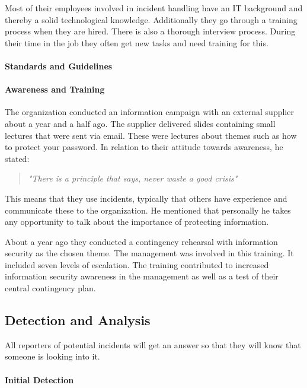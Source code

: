 Most of their employees involved in incident handling have an IT background and thereby a solid technological knowledge. Additionally they go through a training process when they are hired. There is also a thorough interview process. During their time in the job they often get new tasks and need training for this. 

\paragraph{Standards and Guidelines}

\paragraph{Awareness and Training}
The organization conducted an information campaign with an external supplier about a year and a half ago. The supplier delivered slides containing small lectures that were sent via email. These were lectures about themes such as how to protect your password. In relation to their attitude towards awareness, he stated: 

\begin{quote}
\textit{"There is a principle that says, never waste a good crisis"}
\end{quote}

This means that they use incidents, typically that others have experience and communicate these to the organization. He mentioned that personally he takes any opportunity to talk about the importance of protecting information.

About a year ago they conducted a contingency rehearsal with information security as the chosen theme. The management was involved in this training. It included seven levels of escalation. The training contributed to increased information security awareness in the management as well as a test of their central contingency plan.

\subsection{Detection and Analysis}
All reporters of potential incidents will get an answer so that they will know that someone is looking into it.

\paragraph{Initial Detection}

